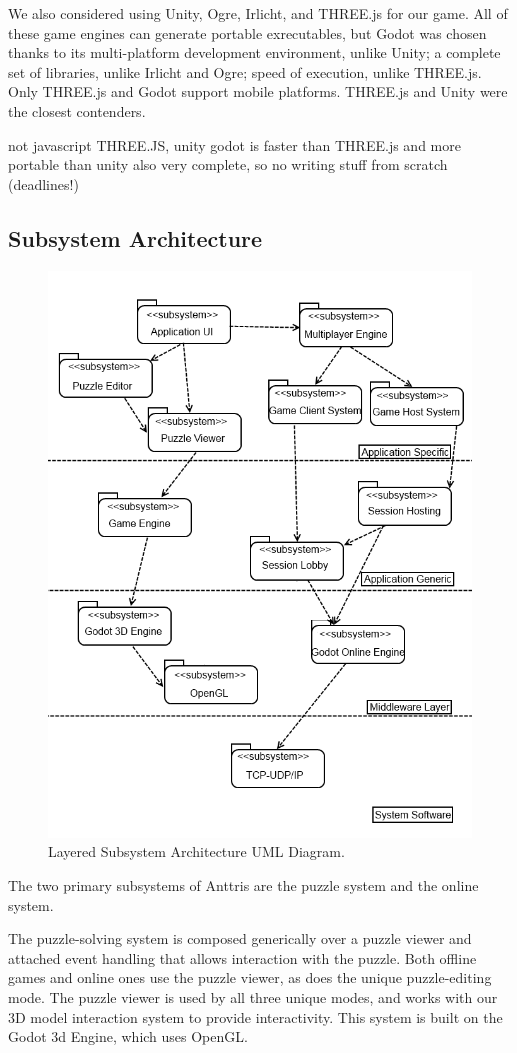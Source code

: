 \documentclass[12pt]{article}
\begin{document}
We also considered using Unity, Ogre, Irlicht, and THREE.js for our
game. All of these game engines can generate portable exrecutables, but Godot
was chosen thanks to its multi-platform development environment, unlike Unity;
a complete set of libraries, unlike Irlicht and Ogre; speed of execution,
unlike THREE.js. Only THREE.js and Godot support mobile platforms.
THREE.js and Unity were the closest contenders.

not javascript THREE.JS, unity
godot is faster than THREE.js and more portable than unity
also very complete, so no writing stuff from scratch (deadlines!)


\subsection{Subsystem Architecture}
\begin{figure}[H]
    \centering
    \includegraphics[width=0.8\linewidth]{subsys_arch.png}
    \caption{Layered Subsystem Architecture UML Diagram.}
\end{figure}
The two primary subsystems of Anttris are the puzzle system and the online system.

The puzzle-solving system is composed generically over a puzzle viewer and attached event
handling that allows interaction with the puzzle. Both offline games and online ones use
the puzzle viewer, as does the unique puzzle-editing mode. The puzzle viewer is used by
all three unique modes, and works with our 3D model interaction system to provide
interactivity. This system is built on the Godot 3d Engine, which uses OpenGL.
\end{document}
